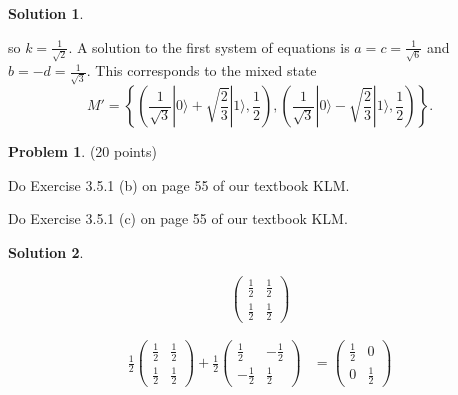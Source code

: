 \documentclass{article}
\theoremstyle{definition}
\newtheorem{problem}{Problem}
\newtheorem*{solution}{Solution}
\newcommand{\ket}[1]{|#1\rangle}
\begin{document}
\begin{solution}
\begin{compactenum}[(a)]
so $k = \frac{1}{\sqrt{2}}$.  A solution to the first system of equations is $a = c = \frac{1}{\sqrt{6}}$ and $b = -d = \frac{1}{\sqrt{3}}$.  This corresponds to the mixed state
$$M' = \left\{ \left( \frac{1}{\sqrt{3}}\ket{0} + \sqrt{\frac{2}{3}} \ket{1}, \frac{1}{2} \right), \left(\frac{1}{\sqrt{3}} \ket{0} - \sqrt{\frac{2}{3}} \ket{1}, \frac{1}{2} \right)\right\}.$$                   
\end{compactenum}
\end{solution}

\begin{problem}{(20 points)}
\begin{compactenum}[(a)]
\item Do Exercise 3.5.1 (b) on page 55 of our textbook KLM.
\item Do Exercise 3.5.1 (c) on page 55 of our textbook KLM.
\end{compactenum}
\end{problem}
\begin{solution}
\begin{compactenum}[(a)]
\item $$\begin{pmatrix}
           \frac{1}{2} & \frac{1}{2}
           \\ \frac{1}{2} & \frac{1}{2}
        \end{pmatrix}
      $$
\item 
\begin{align*}
\frac{1}{2} \begin{pmatrix}
           \frac{1}{2} & \frac{1}{2}
           \\ \frac{1}{2} & \frac{1}{2}
        \end{pmatrix}
+ 
\frac{1}{2} \begin{pmatrix}
           \frac{1}{2} & -\frac{1}{2}
           \\ -\frac{1}{2} & \frac{1}{2}
           \end{pmatrix}
& = 
\begin{pmatrix}
\frac{1}{2} & 0
\\ 0 & \frac{1}{2}
\end{pmatrix}
\end{align*}
\end{compactenum}
\end{solution}
\end{document}
